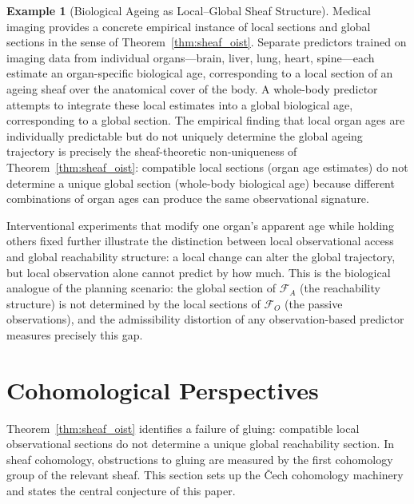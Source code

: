 \documentclass[11pt, a4paper]{article}
\theoremstyle{plain}
\theoremstyle{definition}
\newtheorem{example}[theorem]{Example}
\theoremstyle{remark}
\newcommand{\calF}{\mathcal{F}}
\begin{document}
\begin{example}[Biological Ageing as Local--Global Sheaf Structure]
\label{ex:ageing}
Medical imaging provides a concrete empirical instance of local sections and
global sections in the sense of Theorem~\ref{thm:sheaf_oist}. Separate
predictors trained on imaging data from individual organs---brain, liver, lung,
heart, spine---each estimate an organ-specific biological age, corresponding
to a local section of an ageing sheaf over the anatomical cover of the body.
A whole-body predictor attempts to integrate these local estimates into a
global biological age, corresponding to a global section. The empirical finding
that local organ ages are individually predictable but do not uniquely determine
the global ageing trajectory is precisely the sheaf-theoretic non-uniqueness
of Theorem~\ref{thm:sheaf_oist}: compatible local sections (organ age
estimates) do not determine a unique global section (whole-body biological age)
because different combinations of organ ages can produce the same observational
signature.

Interventional experiments that modify one organ's apparent age while holding
others fixed further illustrate the distinction between local observational
access and global reachability structure: a local change can alter the global
trajectory, but local observation alone cannot predict by how much. This is
the biological analogue of the planning scenario: the global section of
$\calF_A$ (the reachability structure) is not determined by the local sections
of $\calF_O$ (the passive observations), and the admissibility distortion of
any observation-based predictor measures precisely this gap.
\end{example}

\section{Cohomological Perspectives}
\label{sec:cohomology}

Theorem~\ref{thm:sheaf_oist} identifies a failure of gluing: compatible local
observational sections do not determine a unique global reachability section.
In sheaf cohomology, obstructions to gluing are measured by the first
cohomology group of the relevant sheaf. This section sets up the \v{C}ech
cohomology machinery and states the central conjecture of this paper.
\end{document}
